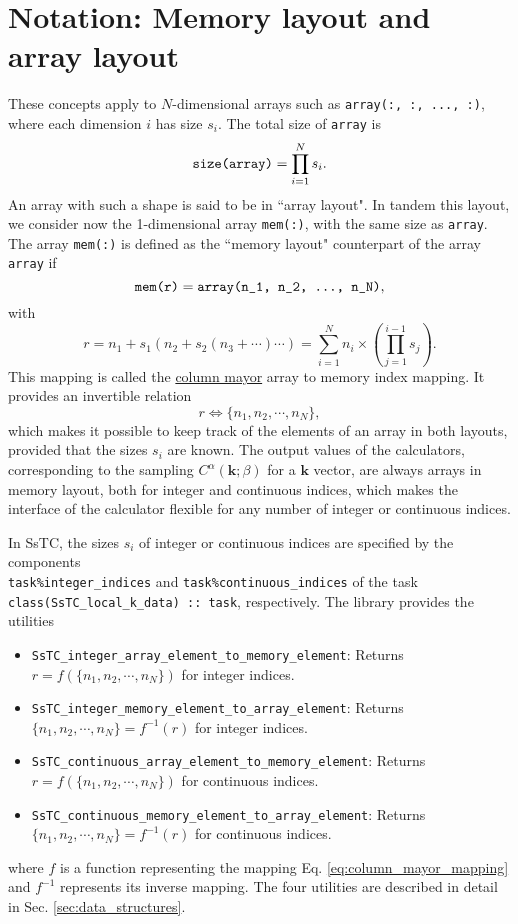 \documentclass[10pt,a4paper]{article}
\begin{document}
\section{Notation: Memory layout and array layout}\label{sec:notation}
These concepts apply to $N$-dimensional arrays such as \verb|array(:, :, ..., :)|, where each dimension $i$ has size $s_i$. The total size of \verb|array| is
\begin{equation}
\verb|size(array)| = \prod_{i=1}^N s_i.
\end{equation}
An array with such a shape is said to be in ``array layout". In tandem this layout, we consider now the 1-dimensional array \verb|mem(:)|, with the same size as \verb|array|. The array \verb|mem(:)| is defined as the ``memory layout" counterpart of the array \verb|array| if
\begin{equation}
\verb|mem(r)| = \verb|array(n_1, n_2, ..., n_N)|,
\end{equation}
with
\begin{equation}\label{eq:column_mayor_mapping}
r = n_1 + s_1\left(n_2 + s_2\left(n_3 + \cdots\right)\cdots\right) = \sum_{i=1}^N n_i\times \left(\prod_{j=1}^{i-1}s_j\right).
\end{equation}
This mapping is called the \href{https://eli.thegreenplace.net/2015/memory-layout-of-multi-dimensional-arrays}{column mayor} array to memory index mapping. It provides an invertible relation
\begin{equation}
r \Leftrightarrow \{n_1, n_2, \cdots, n_N\},
\end{equation}
which makes it possible to keep track of the elements of an array in both layouts, provided that the sizes $s_i$ are known. The output values of the calculators, corresponding to the sampling $C^{\alpha}(\bm{k};\beta)$ for a $\bm{k}$ vector, are always arrays in memory layout, both for integer and continuous indices, which makes the interface of the calculator flexible for any number of integer or continuous indices.

In SsTC, the sizes $s_i$ of integer or continuous indices are specified by the components \\ \verb|task%integer_indices| and \verb|task%continuous_indices| of the task \verb|class(SsTC_local_k_data) :: task|, respectively. The library provides the utilities
\begin{itemize}
\item \verb|SsTC_integer_array_element_to_memory_element|: Returns $r = f(\{n_1, n_2, \cdots, n_N\})$ for integer indices.
\item \verb|SsTC_integer_memory_element_to_array_element|: Returns $\{n_1, n_2, \cdots, n_N\} = f^{-1}(r)$ for integer indices.
\item \verb|SsTC_continuous_array_element_to_memory_element|: Returns $r = f(\{n_1, n_2, \cdots, n_N\})$ for continuous indices.
\item \verb|SsTC_continuous_memory_element_to_array_element|: Returns $\{n_1, n_2, \cdots, n_N\} = f^{-1}(r)$ for continuous indices.
\end{itemize}
where $f$ is a function representing the mapping Eq. \eqref{eq:column_mayor_mapping} and $f^{-1}$ represents its inverse mapping. The four utilities are described in detail in Sec. \ref{sec:data_structures}.
\end{document}
